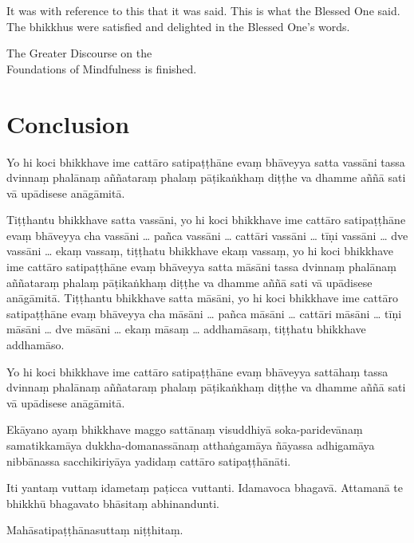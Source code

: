 It was with reference to this that it was said. This is what the Blessed One
said. The bhikkhus were satisfied and delighted in the Blessed One's words.

\bigskip

{\centering\instructionFont\color{instruction}\upshape

  The Greater Discourse on the\\
  Foundations of Mindfulness is finished.

}

\paliPage
\chapter*{Conclusion}

Yo hi koci bhikkhave ime cattāro satipaṭṭhāne evaṃ bhāveyya satta vassāni tassa
dvinnaṃ phalānaṃ aññataraṃ phalaṃ pāṭikaṅkhaṃ diṭṭhe va dhamme aññā sati vā
upādisese anāgāmitā.

Tiṭṭhantu bhikkhave satta vassāni, yo hi koci bhikkhave ime cattāro satipaṭṭhāne
evaṃ bhāveyya cha vassāni \ldots{} pañca vassāni \ldots{} cattāri vassāni
\ldots{} tīṇi vassāni \ldots{} dve vassāni \ldots{} ekaṃ vassaṃ, tiṭṭhatu
bhikkhave ekaṃ vassaṃ, yo hi koci bhikkhave ime cattāro satipaṭṭhāne evaṃ
bhāveyya satta māsāni tassa dvinnaṃ phalānaṃ aññataraṃ phalaṃ pāṭikaṅkhaṃ diṭṭhe
va dhamme aññā sati vā upādisese anāgāmitā. Tiṭṭhantu bhikkhave satta māsāni, yo
hi koci bhikkhave ime cattāro satipaṭṭhāne evaṃ bhāveyya cha māsāni \ldots{}
pañca māsāni \ldots{} cattāri māsāni \ldots{} tīṇi māsāni \ldots{} dve māsāni
\ldots{} ekaṃ māsaṃ \ldots{} addhamāsaṃ, tiṭṭhatu bhikkhave addhamāso.

Yo hi koci bhikkhave ime cattāro satipaṭṭhāne evaṃ bhāveyya sattāhaṃ tassa
dvinnaṃ phalānaṃ aññataraṃ phalaṃ pāṭikaṅkhaṃ diṭṭhe va dhamme aññā sati vā
upādisese anāgāmitā.

Ekāyano ayaṃ bhikkhave maggo sattānaṃ visuddhiyā soka-paridevānaṃ samatikkamāya
dukkha-domanassānaṃ atthaṅgamāya ñāyassa adhigamāya nibbānassa sacchikiriyāya
yadidaṃ cattāro satipaṭṭhānāti.

Iti yantaṃ vuttaṃ idametaṃ paṭicca vuttanti. Idamavoca bhagavā. Attamanā te
bhikkhū bhagavato bhāsitaṃ abhinandunti.

\bigskip

{\centering\instructionFont\color{instruction}\upshape

  Mahāsatipaṭṭhānasuttaṃ niṭṭhitaṃ.

}

\resumeNormalText
